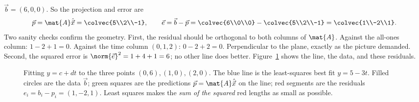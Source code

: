 $\vec{b}=(6,0,0)$. So the projection and error are
\[
  \vec{p}=\mat{A}\hat{\vec{x}}=\colvec{5\\2\\-1},
  \qquad
  \vec{e}=\vec{b}-\vec{p}=\colvec{6\\0\\0}-\colvec{5\\2\\-1}=\colvec{1\\-2\\1}.
\]
Two sanity checks confirm the geometry. First, the residual should be orthogonal to both columns
of $\mat{A}$. Against the all-ones column: $1-2+1=0$. Against the time column $(0,1,2)$:
$0-2+2=0$. Perpendicular to the plane, exactly as the picture demanded. Second, the squared error
is $\norm{\vec{e}}^2 = 1+4+1=6$; no other line does better.
Figure~\ref{ch19:line-fit} shows the line, the data, and these residuals.

\begin{figure}[H]
\centering
{}
\caption{Fitting $y=c+dt$ to the three points $(0,6),(1,0),(2,0)$. The blue line is the
least-squares best fit $y=5-3t$. Filled circles are the data $\vec{b}$; green squares are the
predictions $\vec{p}=\mat{A}\hat{\vec{x}}$ on the line; red segments are the residuals
$e_i=b_i-p_i=(1,-2,1)$. Least squares makes the \emph{sum of the squared} red lengths as small as
possible.}
\label{ch19:line-fit}
\end{figure}

